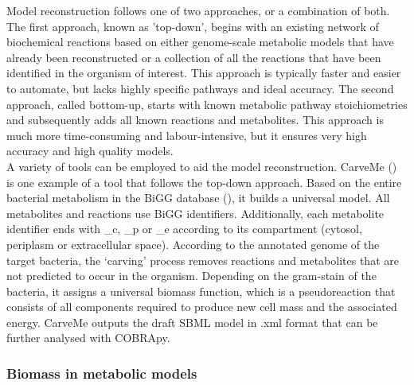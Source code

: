 Model reconstruction follows one of two approaches, or a combination of both. The first approach, known as 'top-down', begins with an existing network of biochemical reactions based on either genome-scale metabolic models that have already been reconstructed or a collection of all the reactions that have been identified in the organism of interest. This approach is typically faster and easier to automate, but lacks highly specific pathways and ideal accuracy. The second approach, called bottom-up, starts with known metabolic pathway stoichiometries and subsequently adds all known reactions and metabolites. This approach is much more time-consuming and labour-intensive, but it ensures very high accuracy and high quality models.
\\


A variety of tools can be employed to aid the model reconstruction. CarveMe (\cite{machado_fast_2018}) is one example of a tool that follows the top-down approach. Based on the entire bacterial metabolism in the BiGG database (\cite{king_bigg_2016}), it builds a universal model. All metabolites and reactions use BiGG identifiers. Additionally, each metabolite identifier ends with \_c, \_p or \_e according to its compartment (cytosol, periplasm or extracellular space).  According to the annotated genome of the target bacteria, the ‘carving’ process removes reactions and metabolites that are not predicted to occur in the organism. Depending on the gram-stain of the bacteria, it assigns a universal biomass function, which is a pseudoreaction that consists of all components required to produce new cell mass and the associated energy. CarveMe outputs the draft SBML model in .xml format that can be further analysed with COBRApy.

\subsubsection{Biomass in metabolic models}
